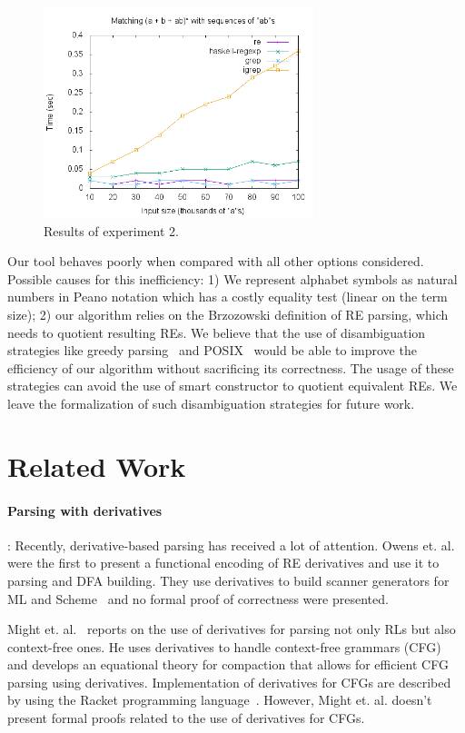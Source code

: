 \documentclass{llncs}
\begin{document}
\begin{figure}[!ht]
    \includegraphics[width=0.7\textwidth]{abs.png}
   \centering
   \caption{Results of experiment 2.}
   \label{fig:graph2}
\end{figure}

Our tool behaves poorly when compared with all other options
considered. Possible causes for this inefficiency: 1) We represent
alphabet symbols as natural numbers in Peano notation which has
a costly equality test (linear on the term size); 2) our algorithm
relies on the Brzozowski definition of RE
parsing, which needs to quotient resulting REs. We believe that the
use of disambiguation strategies like greedy parsing~\cite{FrischC04}
and POSIX~\cite{SulzmannL14} would be able to improve the efficiency
of our algorithm without sacrificing its correctness. The usage of
these strategies can avoid the use of smart constructor to quotient
equivalent REs. We leave the formalization of such disambiguation
strategies for future work.

\section{Related Work}\label{sec:related}

\paragraph{Parsing with derivatives}: Recently, derivative-based parsing has
received a lot of attention. Owens et. al. were the first to present a
functional encoding of RE derivatives and use it to parsing and DFA
building. They use derivatives to build scanner generators for ML and 
Scheme~\cite{Owens2009} and no formal proof of correctness were
presented.

Might et. al.~\cite{Might2011} reports on
the use of derivatives for parsing not only RLs but also context-free
ones. He uses derivatives to handle context-free grammars (CFG) and
develops an equational theory for compaction that allows for efficient
CFG parsing using derivatives. Implementation of derivatives for CFGs
are described by using the Racket programming
language~\cite{Felleisen2013}. However, Might et. al. doesn't present
formal proofs related to the use of derivatives for CFGs.
\end{document}

